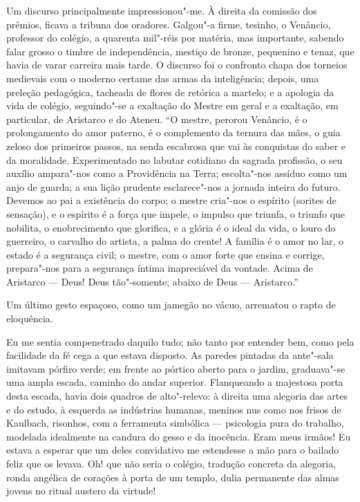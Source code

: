Um discurso principalmente impressionou"-me. À direita
da comissão dos prêmios, ficava a tribuna dos oradores. Galgou"-a
firme, tesinho, o Venâncio, professor do colégio, a quarenta mil"-réis
por matéria, mas importante, sabendo falar grosso o timbre de
independência, mestiço de bronze, pequenino e tenaz, que havia de varar
carreira mais tarde. O discurso foi o confronto chapa dos torneios
medievais com o moderno certame das armas da inteligência; depois, uma
preleção pedagógica, tacheada de flores de retórica a martelo; e a
apologia da vida de colégio, seguindo"-se a exaltação do Mestre em
geral e a exaltação, em particular, de Aristarco e do Ateneu. ``O
mestre, perorou Venâncio, é o prolongamento do amor paterno, é o complemento da
ternura das mães, o guia zeloso dos primeiros passos, na senda
escabrosa que vai às conquistas do saber e da moralidade. Experimentado
no labutar cotidiano da sagrada profissão, o seu auxílio ampara"-nos
como a Providência na Terra; escolta"-nos assíduo como um anjo de
guarda; a sua lição prudente esclarece"-nos a jornada inteira do futuro.
Devemos ao pai a existência do corpo; o mestre cria"-nos o espírito
(sorites de sensação), e o espírito é a força que impele, o impulso que
triunfa, o triunfo que nobilita, o enobrecimento que glorifica, e a
glória é o ideal da vida, o louro do guerreiro, o carvalho do artista,
a palma do crente! A família é o amor no lar, o estado é a segurança
civil; o mestre, com o amor forte que ensina e corrige, prepara"-nos
para a segurança íntima inapreciável da vontade. Acima de Aristarco --- 
Deus! Deus tão"-somente; abaixo de Deus --- Aristarco.'' 

Um último gesto espaçoso, como um jamegão no vácuo, arrematou o rapto de
eloquência. 

Eu me sentia compenetrado daquilo tudo; não tanto por
entender bem, como pela facilidade da fé cega a que estava disposto. As
paredes pintadas da ante"-sala imitavam pórfiro verde; em frente ao
pórtico aberto para o jardim, graduava"-se uma ampla escada, caminho
do andar superior. Flanqueando a majestosa porta desta escada, havia
dois quadros de alto"-relevo: à direita uma alegoria das artes e do
estudo, à esquerda as indústrias humanas, meninos nus como nos frisos
de Kaulbach, risonhos, com a ferramenta simbólica --- psicologia pura
do trabalho, modelada idealmente na candura do gesso e da inocência.
Eram meus irmãos! Eu estava a esperar que um deles convidativo me
estendesse a mão para o bailado feliz que os levava. Oh! que não seria
o colégio, tradução concreta da alegoria, ronda angélica de corações à
porta de um templo, dulia permanente das almas jovens no ritual austero
da virtude! 

